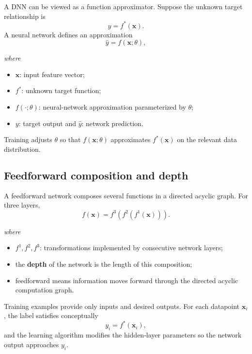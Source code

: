 \documentclass[11pt,a4paper]{report}
\newcommand{\vect}[1]{\bm{#1}}
\newcommand{\wherelegend}{\par\smallskip\textit{where}\vspace{-0.3em}}
\begin{document}
A DNN can be viewed as a function approximator. Suppose the unknown target relationship is
\begin{equation}
  y=f^*(\vect{x}).
  \label{eq:true-function}
\end{equation}
A neural network defines an approximation
\begin{equation}
  \hat y=f(\vect{x};\theta),
  \label{eq:dnn-function}
\end{equation}
\wherelegend
\begin{itemize}
  \item $\vect{x}$: input feature vector;
  \item $f^*$: unknown target function;
  \item $f(\cdot;\theta)$: neural-network approximation parameterized by $\theta$;
  \item $y$: target output and $\hat y$: network prediction.
\end{itemize}
Training adjusts $\theta$ so that $f(\vect{x};\theta)$ approximates $f^*(\vect{x})$ on the relevant data distribution.

\subsection{Feedforward composition and depth}

A feedforward network composes several functions in a directed acyclic graph. For three layers,
\begin{equation}
  f(\vect{x})=f^3\!\left(f^2\!\left(f^1(\vect{x})\right)\right).
  \label{eq:function-composition}
\end{equation}
\wherelegend
\begin{itemize}
  \item $f^1,f^2,f^3$: transformations implemented by consecutive network layers;
  \item the \textbf{depth} of the network is the length of this composition;
  \item feedforward means information moves forward through the directed acyclic computation graph.
\end{itemize}

Training examples provide only inputs and desired outputs. For each datapoint $\vect{x}_i$, the label satisfies conceptually
\begin{equation}
  y_i=f^*(\vect{x}_i),
\end{equation}
and the learning algorithm modifies the hidden-layer parameters so the network output approaches $y_i$.
\end{document}
